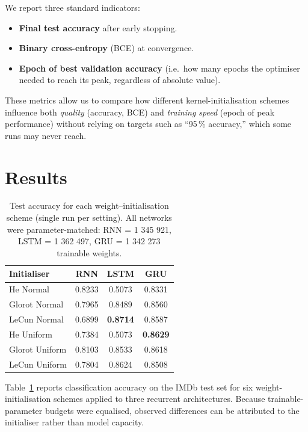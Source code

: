\documentclass[conference]{IEEEtran}
\begin{document}
We report three standard indicators:

\begin{itemize}
  \item \textbf{Final test accuracy} after early stopping.
  \item \textbf{Binary cross-entropy} (BCE) at convergence.
  \item \textbf{Epoch of best validation accuracy}
        (i.e.\ how many epochs the optimiser needed to reach its peak,
        regardless of absolute value).
\end{itemize}

These metrics allow us to compare how different kernel-initialisation
schemes influence both \emph{quality} (accuracy, BCE) and \emph{training
speed} (epoch of peak performance) without relying on targets such as
“95\,\% accuracy,” which some runs may never reach.


\section*{Results}\label{sec:results}

\begin{table}[H]
  \caption{Test accuracy for each weight–initialisation scheme (single run per setting).  
           All networks were parameter-matched: RNN = 1 345 921, LSTM = 1 362 497,
           GRU = 1 342 273 trainable weights.}
  \label{tab:init-acc}
  \centering
  \begin{tabular}{@{}lccc@{}}
    \toprule
    \textbf{Initialiser} & \textbf{RNN} & \textbf{LSTM} & \textbf{GRU}\\
    \midrule
    He Normal        & 0.8233 & 0.5073 & 0.8331\\
    Glorot Normal    & 0.7965 & 0.8489 & 0.8560\\
    LeCun Normal     & 0.6899 & \textbf{0.8714} & 0.8587\\
    He Uniform       & 0.7384 & 0.5073 & \textbf{0.8629}\\
    Glorot Uniform   & 0.8103 & 0.8533 & 0.8618\\
    LeCun Uniform    & 0.7804 & 0.8624 & 0.8508\\
    \bottomrule
  \end{tabular}
\end{table}

Table~\ref{tab:init-acc} reports classification accuracy on the IMDb test set for six weight-initialisation schemes applied to three recurrent architectures.  Because trainable-parameter budgets were equalised, observed differences can be attributed to the initialiser rather than model capacity.
\end{document}
